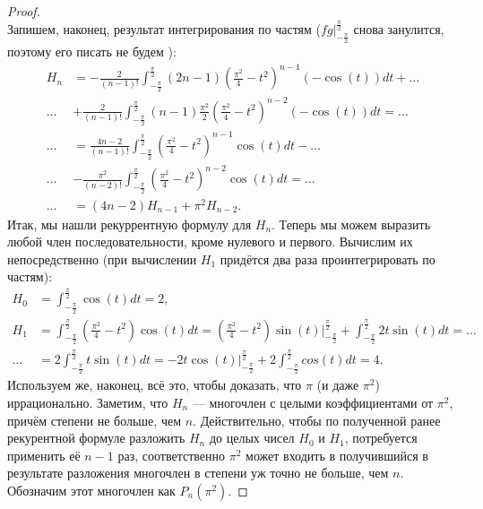 \begin{proof}
\[	\]
	Запишем, наконец, результат интегрирования по частям
	\bigg(\(fg \bigg|_{-\frac\pi2}^{\frac\pi2}\) снова занулится, поэтому его писать не будем \bigg):
	\begin{align*}
		H_n &= -\frac2{(n - 1)!} \int_{-\frac\pi2}^{\frac\pi2}
		(2n - 1) \left(\frac{\pi^2}4 - t^2 \right)^{n - 1} (-\cos(t)) dt + \ldots \\
		\ldots &+ \frac2{(n - 1)!} \int_{-\frac\pi2}^{\frac\pi2}
		(n - 1) \frac{\pi^2}2 \left(\frac{\pi^2}4 - t^2 \right)^{n - 2} (-\cos(t)) dt = \ldots \\
		\ldots &= \frac{4n - 2}{(n - 1)!} \int_{-\frac\pi2}^{\frac\pi2}
		\left(\frac{\pi^2}4 - t^2 \right)^{n - 1} \cos(t) dt - \ldots \\
		\ldots &- \frac{\pi^2}{(n - 2)!} \int_{-\frac\pi2}^{\frac\pi2} \left(\frac{\pi^2}4 - t^2 \right)^{n - 2} \cos(t) dt = \ldots \\
		\ldots &= (4n - 2) H_{n - 1} + \pi^2 H_{n - 2}.
	\end{align*}
	Итак, мы нашли рекуррентную формулу для \(H_n\). Теперь мы можем выразить любой член последовательности, кроме нулевого и первого. Вычислим их непосредственно
	(при вычислении \(H_1\) придётся два раза проинтегрировать по частям):
	\begin{align*}
		H_0 &= \int_{-\frac\pi2}^{\frac\pi2} \cos(t) dt = 2, \\
		H_1 &= \int_{-\frac\pi2}^{\frac\pi2}
		\left(\frac{\pi^2}4 - t^2 \right) \cos(t) dt =
		\left(\frac{\pi^2}4 - t^2 \right) \sin(t)
		\bigg|_{-\frac\pi2}^{\frac\pi2} + \int_{-\frac\pi2}^{\frac\pi2} 2t \sin(t) dt = \ldots \\
		\ldots &= 2 \int_{-\frac\pi2}^{\frac\pi2} t \sin(t) dt = -2t \cos(t) \bigg|_{-\frac\pi2}^{\frac\pi2} + 2 \int_{-\frac\pi2}^{\frac\pi2} cos(t) dt = 4.
	\end{align*}
	Используем же, наконец, всё это, чтобы доказать, что \(\pi\) (и даже \(\pi^2\)) иррационально. Заметим, что \(H_n\) --- многочлен с целыми коэффициентами от \(\pi^2\), причём степени не больше, чем \(n\). Действительно, чтобы по полученной ранее рекурентной формуле разложить \(H_n\) до целых чисел \(H_0\) и \(H_1\), потребуется применить её \(n - 1\) раз, соответственно \(\pi^2\) может входить в получившийся в результате разложения многочлен в степени уж точно не больше, чем \(n\). Обозначим этот многочлен как \(P_n(\pi^2)\).
	

\end{proof}
